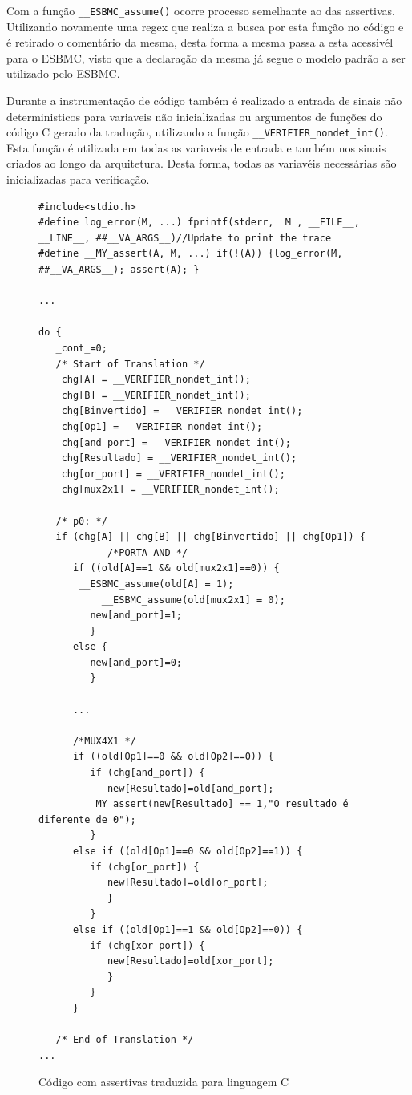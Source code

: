 \par
Com a função \texttt{\_\_ESBMC\_assume()} ocorre processo semelhante ao das assertivas. Utilizando novamente uma regex que realiza a busca por esta função no código e é retirado o comentário da mesma, desta forma a mesma passa a esta acessivél para o ESBMC, visto que a declaração da mesma já segue o modelo padrão a ser utilizado pelo ESBMC.

\par
Durante a instrumentação de código também é realizado a entrada de sinais não deterministicos para variaveis não inicializadas ou argumentos de funções do código C gerado da tradução, utilizando a função \texttt{\_\_VERIFIER\_nondet\_int()}. Esta função é utilizada em todas as variaveis de entrada e também nos sinais criados ao longo da arquitetura. Desta forma, todas as variavéis necessárias são inicializadas para verificação.


\begin{figure}[htp]
\caption{\label{fig:assert_c} Código com assertivas traduzida para linguagem C}
	\begin{center}
    \begin{minipage}{0.99\textwidth}
    \begin{lstlisting}       
#include<stdio.h>
#define log_error(M, ...) fprintf(stderr,  M , __FILE__, __LINE__, ##__VA_ARGS__)//Update to print the trace
#define __MY_assert(A, M, ...) if(!(A)) {log_error(M, ##__VA_ARGS__); assert(A); }

...

do {
   _cont_=0;
   /* Start of Translation */
    chg[A] = __VERIFIER_nondet_int(); 
    chg[B] = __VERIFIER_nondet_int(); 
    chg[Binvertido] = __VERIFIER_nondet_int(); 
    chg[Op1] = __VERIFIER_nondet_int();
    chg[and_port] = __VERIFIER_nondet_int();
    chg[Resultado] = __VERIFIER_nondet_int();
    chg[or_port] = __VERIFIER_nondet_int();
    chg[mux2x1] = __VERIFIER_nondet_int();

   /* p0: */
   if (chg[A] || chg[B] || chg[Binvertido] || chg[Op1]) {
            /*PORTA AND */
      if ((old[A]==1 && old[mux2x1]==0)) {
	   __ESBMC_assume(old[A] = 1);
           __ESBMC_assume(old[mux2x1] = 0);
         new[and_port]=1;
         }
      else {
         new[and_port]=0;
         }

      ...

      /*MUX4X1 */
      if ((old[Op1]==0 && old[Op2]==0)) {
         if (chg[and_port]) {
            new[Resultado]=old[and_port];
	    __MY_assert(new[Resultado] == 1,"O resultado é diferente de 0");
         }
      else if ((old[Op1]==0 && old[Op2]==1)) {
         if (chg[or_port]) {
            new[Resultado]=old[or_port];
            }
         }
      else if ((old[Op1]==1 && old[Op2]==0)) {
         if (chg[xor_port]) {
            new[Resultado]=old[xor_port];
            }
         }
      }

   /* End of Translation */
...
    \end{lstlisting}
    \end{minipage}
	\end{center}
\end{figure}

